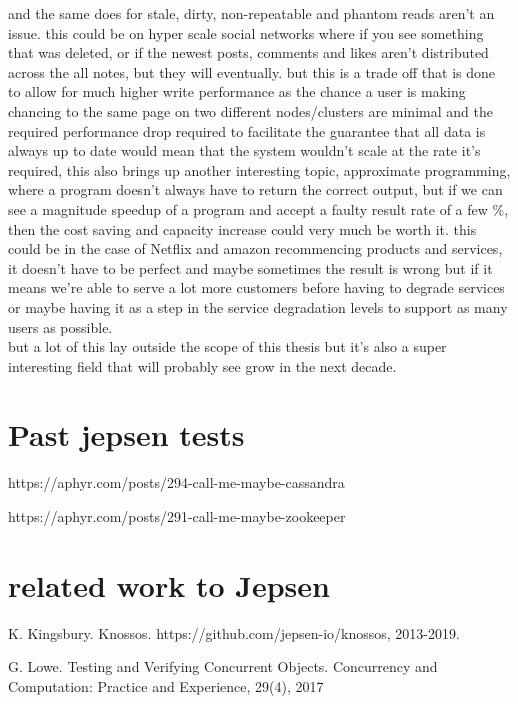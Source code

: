 \documentclass[a4paper,10pt,titlepage]{report}
\begin{document}
and the same does for stale, dirty, non-repeatable and phantom reads aren't an issue. this could be on hyper scale social networks where if you see something that was deleted, or if the newest posts, comments and likes aren't distributed across the all notes, but they will eventually. but this is a trade off that is done to allow for much higher write performance as the chance a user is making chancing to the same page on two different nodes/clusters are minimal and the required performance drop required to facilitate the guarantee that all data is always up to date would mean that the system wouldn't scale at the rate it's required, this also brings up another interesting topic, approximate programming, where a program doesn't always have to return the correct output, but if we can see a magnitude speedup of a program and accept a faulty result rate of a few \%, then the cost saving and capacity increase could very much be worth it. this could be in the case of Netflix and amazon recommencing products and services, it doesn't have to be perfect and maybe sometimes the result is wrong but if it means we're able to serve a lot more customers before having to degrade services or maybe having it as a step in the service degradation levels to support as many users as possible. \\
\vspace{5mm}
but a lot of this lay outside the scope of this thesis but it's also a super interesting field that will probably see grow in the next decade.





\section{Past jepsen tests}

https://aphyr.com/posts/294-call-me-maybe-cassandra


https://aphyr.com/posts/291-call-me-maybe-zookeeper



\section{related work to Jepsen}


K. Kingsbury. Knossos.
https://github.com/jepsen-io/knossos, 2013-2019.

G. Lowe. Testing and Verifying Concurrent Objects.
Concurrency and Computation: Practice and
Experience, 29(4), 2017
\end{document}
